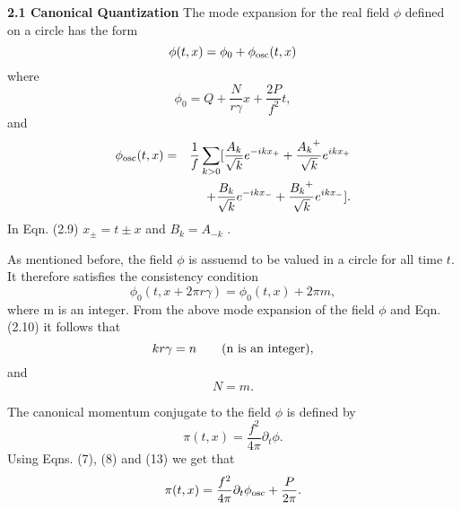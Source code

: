 \documentclass[a4paper,12pt]{article}
\begin{document}
\vskip 5mm
\noindent
{\bf 2.1 Canonical Quantization}
\vskip 5mm
\noindent
The mode expansion for the real 
field $\phi$ defined on a circle has the form
\begin{equation}
{\phi}(t,x)=\phi_0 +  {\phi}_{\rm {osc}}(t,x)
\end{equation}
where
\begin{equation}
\phi_0 =  Q +\frac{N}{r{\gamma}} x + {\frac{2P}{f^2}}t,
\end{equation}
and
\begin{eqnarray}
{\phi}_{\rm {osc}}(t,x)&=&\frac{1}{f} \sum_{k>0}
[ \frac{A_{k}}{\sqrt{k}}e^{-ikx_{+}} +\frac{{A_{k}}^{+}}
{\sqrt{k}}e^{ikx_{+}}\nonumber\\
&&+\frac{B_{k}}{\sqrt{k}}e^{-ikx_{-}} + 
\frac{{B_{k}}^{+}}{\sqrt{k}}e^{ikx_{-}}].\nonumber\\
\end{eqnarray}
In Eqn. (2.9) $x_{\pm}=t{\pm}x $ and $ B_k=A_{-k} $ . 

As mentioned before, the field $\phi$ is assuemd to be valued in a circle
for all time $t$.
It therefore satisfies the consistency condition
\begin{equation}
{\phi}_0(t,x+ 2 \pi r \gamma)={\phi}_0(t,x) + 2{\pi}m,
\end{equation}  
where m is an integer. 
From the above mode expansion of the field $\phi$ and Eqn. (2.10)
it follows that
\begin{equation}
 k r \gamma = n~~~~~~\rm{(n~ is~ an~ integer),}
\end{equation}
and
\begin{equation}
N = m.
\end{equation}

The canonical momentum conjugate to the field $\phi$ is defined by 
\begin{equation}
{\pi}(t,x)=\frac{f^2}{4{\pi}}{\partial}_{t}{\phi}.
\end{equation}
Using Eqns. (7), (8) and (13)  we get that
\begin{equation}
\pi(t,x) = \frac{f^2}{4{\pi}}{\partial}_{t}{\phi}_{\rm {osc}}
 + \frac{P}{2{\pi}}.
\end{equation}
\end{document}
